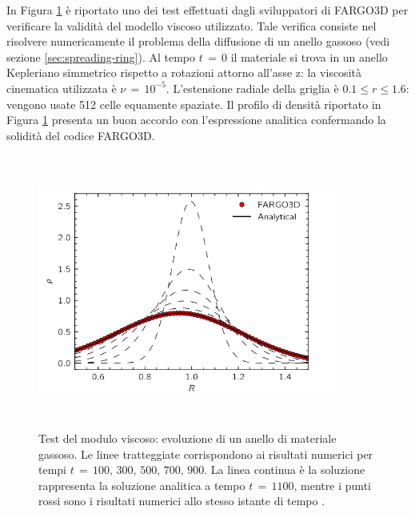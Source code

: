 In Figura \ref{fig:test_idro} è riportato uno dei test effettuati dagli sviluppatori di FARGO3D per verificare la validità del modello viscoso utilizzato. Tale verifica consiste nel risolvere numericamente il problema della diffusione di un anello gassoso (vedi sezione \ref{sec:spreading-ring}).
Al tempo $t\,=\,0$ il materiale si trova in un anello Kepleriano simmetrico rispetto a rotazioni attorno all'asse z: la viscosità cinematica utilizzata è $\nu\,=\,10^{-5}$. L'estensione radiale della griglia è $0.1\leq r \leq 1.6$: vengono usate 512 celle equamente spaziate. Il profilo di densità riportato in Figura \ref{fig:test_idro} presenta un buon accordo con l'espressione analitica confermando la solidità del codice FARGO3D.
\begin{figure}[H]
    \centering
    \includegraphics[height=9cm, width=10cm]{Immagini/Simulazioni/TestIdrodinamico.png}
    \caption{Test del modulo viscoso: evoluzione di un anello di materiale gassoso. Le linee tratteggiate corrispondono ai risultati numerici per tempi $t\,=\,100,\,300,\,500,\,700,\,900.$ La linea continua è la soluzione rappresenta la soluzione analitica a tempo $t\,=\,1100$, mentre i punti rossi sono i risultati numerici allo stesso istante di tempo \parencite{Fargo3D}.}
    \label{fig:test_idro}
\end{figure}


